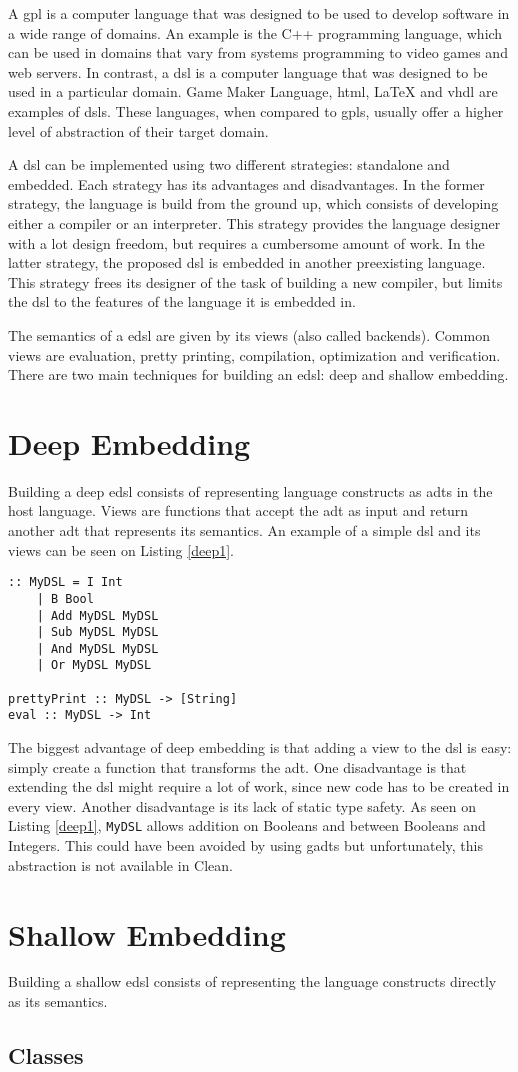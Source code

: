 A \ac{gpl} is a computer language that was designed to be used to develop software in a wide range of domains. An example is the C++ programming language, which can be used in domains that vary from systems programming to video games and web servers. In contrast, a \ac{dsl} is a computer language that was designed to be used in a particular domain. Game Maker Language, \acs{html}, LaTeX and \acs{vhdl} are examples of \ac{dsl}s. These languages, when compared to \ac{gpl}s, usually offer a higher level of abstraction of their target domain.

A \ac{dsl} can be implemented using two different strategies: standalone and embedded. Each strategy has its advantages and disadvantages. In the former strategy, the language is build from the ground up, which consists of developing either a compiler or an interpreter. This strategy provides the language designer with a lot design freedom, but requires a cumbersome amount of work. In the latter strategy, the proposed \ac{dsl} is embedded in another preexisting language. This strategy frees its designer of the task of building a new compiler, but limits the \ac{dsl} to the features of the language it is embedded in.

The semantics of a \ac{edsl} are given by its views (also called backends). Common views are evaluation, pretty printing, compilation, optimization and verification. There are two main techniques for building an \ac{edsl}: deep and shallow embedding.

\section{Deep Embedding}

Building a deep \ac{edsl} consists of representing language constructs as \acp{adt} in the host language. Views are functions that accept the \ac{adt} as input and return another \ac{adt} that represents its semantics. An example of a simple \ac{dsl} and its views can be seen on Listing \ref{deep1}.

\begin{lstlisting}[caption=A simple DSL and its views,captionpos=b,label=deep1]
:: MyDSL = I Int
    | B Bool
    | Add MyDSL MyDSL
    | Sub MyDSL MyDSL
    | And MyDSL MyDSL
    | Or MyDSL MyDSL
    
prettyPrint :: MyDSL -> [String]
eval :: MyDSL -> Int
\end{lstlisting}

The biggest advantage of deep embedding is that adding a view to the \ac{dsl} is easy: simply create a function that transforms the \ac{adt}. One disadvantage is that extending the \ac{dsl} might require a lot of work, since new code has  to be created in every view. Another disadvantage is its lack of static type safety. As seen on Listing \ref{deep1}, \texttt{MyDSL} allows addition on Booleans and between Booleans and Integers. This could have been avoided by using \acp{gadt} but unfortunately, this abstraction is not available in Clean.

\section{Shallow Embedding}
Building a shallow \ac{edsl} consists of representing the language constructs directly as its semantics. 

\subsection{Classes}

